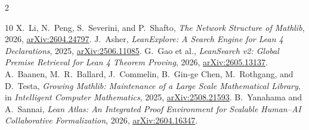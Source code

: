\documentclass[11pt]{article}
\begin{document}
{\begin{multicols}{2}
\begin{thebibliography}{10}
 X.~Li, N.~Peng, S.~Severini, and P.~Shafto,
\emph{The Network Structure of Mathlib}, 2026,
\href{https://doi.org/10.48550/arXiv.2604.24797}{arXiv:2604.24797}.
 J.~Asher, \emph{LeanExplore: A Search Engine for Lean 4
Declarations}, 2025,
\href{https://doi.org/10.48550/arXiv.2506.11085}{arXiv:2506.11085}.
 G.~Gao et al., \emph{LeanSearch v2: Global Premise
Retrieval for Lean 4 Theorem Proving}, 2026,
\href{https://doi.org/10.48550/arXiv.2605.13137}{arXiv:2605.13137}.
 A.~Baanen, M.~R.~Ballard, J.~Commelin,
B.~Gin-ge Chen, M.~Rothgang, and D.~Testa, \emph{Growing Mathlib:
Maintenance of a Large Scale Mathematical Library}, in \emph{Intelligent
Computer Mathematics}, 2025,
\href{https://doi.org/10.48550/arXiv.2508.21593}{arXiv:2508.21593}.
 B.~Yanahama and A.~Sannai, \emph{Lean Atlas: An
Integrated Proof Environment for Scalable Human--AI Collaborative
Formalization}, 2026,
\href{https://doi.org/10.48550/arXiv.2604.16347}{arXiv:2604.16347}.
\end{thebibliography}
\end{multicols}
}
\end{document}
